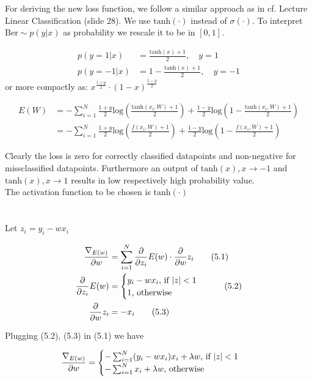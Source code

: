\documentclass[11pt]{article}
\newcommand{\exercise}{\section{}}
\newcommand{\sumf}[3]{\sum_{#1}^{#2} #3}
\newcommand{\ifelse}[4]{%
\begingroup
\begin{cases}
  {#1} \text{, if {#2}} \\
  {#3} \text{, otherwise {#4}}
\end{cases}
\endgroup
}
\newcommand{\gradf}[2]{\frac{\nabla_{#1}}{{\partial #2}}}
\newcommand{\partialf}[1]{\frac{\partial}{{\partial #1}}}
\begin{document}
\exercise

For deriving the new loss function, we follow a similar approach as in cf. Lecture Linear Classification (slide 28). We use $ \text{tanh}( \cdot ) $ instead of $\sigma( \cdot )$. To interpret $\text{Ber} \sim p( y | x)$ as probability we rescale it to be in $[0, 1]$.

\begin{align*}
p( y = 1 | x) &=\frac{\text{tanh}(x) + 1}{2}, \quad y = 1 \\
p( y = -1 | x) &=1 - \frac{\text{tanh}(x) + 1}{2}, \quad y = -1
\end{align*}
or more compactly as:
$x^{\frac{1 + y}{2}} \cdot (1 - x)^{\frac{1 - y}{2}}$

\begin{align*}
E(W) &= -\sumf{i = 1}{N}{ \frac{1 + y}{2} \text{log}(\frac{\text{tanh}(x_i, W) + 1}{2}) + \frac{1 - y}{2} \text{log}(1 - \frac{\text{tanh}(x_i, W) + 1}{2})} \\
&= -\sumf{i = 1}{N}{ \frac{1 + y}{2} \text{log}(\frac{f(x_i, W) + 1}{2}) + \frac{1 - y}{2} \text{log}(1 - \frac{f(x_i, W) + 1}{2})}
\end{align*}

\noindent Clearly the loss is zero for correctly classified datapoints and non-negative for missclassified datapoints. Furthermore an output of $\text{tanh}(x), x \rightarrow -1$ and  $\text{tanh}(x), x \rightarrow 1$ results in low respectively high probability value. 
\\
The activation function to be chosen is $\text{tanh}(\cdot)$

\exercise

Let $z_i = y_i - w x_i$

\begin{align*}
\gradf{E(w)}{w} &= \sumf{i=1}{N}{\partialf{z_i}E(w) \cdot \partialf{w}z_i} \tag{5.1} \\
\partialf{z_i}E(w) &= \ifelse{y_i - w x_i}{$\vert z \vert < 1$}{1}{} \tag{5.2} \\
\partialf{w}z_i &= -x_i \tag{5.3}
\end{align*}

\noindent Plugging (5.2), (5.3) in (5.1) we have

\begin{align*}
\gradf{E(w)}{w} &= \ifelse{-\sumf{i=1}{N}{ (y_i - w x_i) x_i} + \lambda w}{$\vert z \vert < 1$}{-\sumf{i=1}{N}{x_i} + \lambda w}{}
\end{align*}

\exercise
\end{document}

